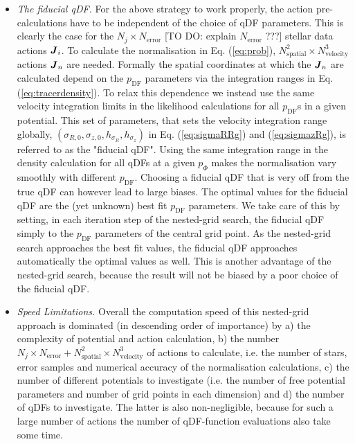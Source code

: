 \begin{itemize}
\item \emph{The fiducial qDF.} For the above strategy to work properly, the action pre-calculations have to be independent of the choice of qDF parameters. This is clearly the case for the $N_j \times N_\text{error}$ [TO DO: explain $N_\text{error}$ ???]  stellar data actions $\boldsymbol{J}_i$. To calculate the normalisation in Eq. (\ref{eq:prob}), $N_\text{spatial}^2 \times N_\text{velocity}^3$ actions $\boldsymbol{J}_n$ are needed. Formally the spatial coordinates at which the $\boldsymbol{J}_n$ are calculated depend on the $p_\text{DF}$ parameters via the integration ranges in Eq. (\ref{eq:tracerdensity}). To relax this dependence we instead use the same velocity integration limits in the likelihood calculations for all $p_\text{DF}$s in a given potential. This set of parameters, that sets the velocity integration range globally, $(\sigma_{R,0},\sigma_{z,0},h_{\sigma_R},h_{\sigma_z})$ in Eq. (\ref{eq:sigmaRRg}) and (\ref{eq:sigmazRg}), is referred to as the "fiducial qDF". Using the same integration range in the density calculation for all qDFs at a given $p_\Phi$ makes the normalisation vary smoothly with different $p_\text{DF}$. Choosing a fiducial qDF that is very off from the true qDF can however lead to large biases. The optimal values for the fiducial qDF are the (yet unknown) best fit $p_\text{DF}$ parameters. We take care of this by setting, in each iteration step of the nested-grid search, the fiducial qDF simply to the $p_\text{DF}$ parameters of the central grid point.  As the nested-grid search approaches the best fit values, the fiducial qDF approaches automatically the optimal values as well. This is another advantage of the nested-grid search, because the result will not be biased by a poor choice of the fiducial qDF.

\item \emph{Speed Limitations.} Overall the computation speed of this nested-grid approach is dominated (in descending order of importance) by a) the complexity of potential and action calculation, b) the number $N_j \times N_\text{error} + N_\text{spatial}^2 \times N_\text{velocity}^3$ of actions to calculate, i.e. the number of stars, error samples and numerical accuracy of the normalisation calculations, c) the number of different potentials to investigate (i.e. the number of free potential parameters and number of grid points in each dimension) and d) the number of qDFs to investigate. The latter is also non-negligible, because for such a large number of actions the number of  qDF-function evaluations also take some time.
\end{itemize}

